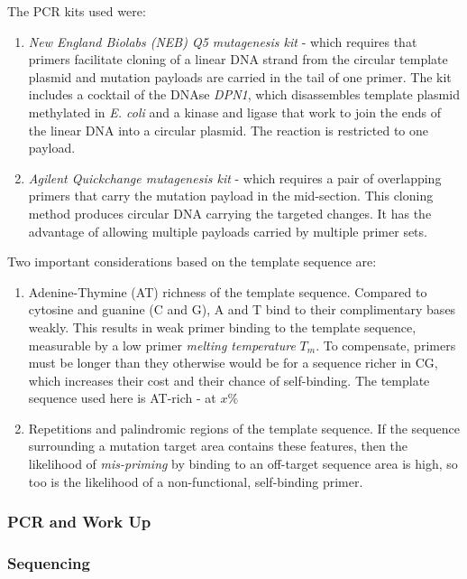 \documentclass{article}
\begin{document}
The PCR kits used were:

\begin{enumerate}
	\item \textit{New England Biolabs (NEB) Q5 mutagenesis kit} - which requires that primers facilitate cloning of a linear DNA strand from the circular template plasmid and mutation payloads are carried in the tail of one primer.
	The kit includes a cocktail of the DNAse \textit{DPN1}, which disassembles template plasmid methylated in \textit{E. coli} and a kinase and ligase that work to join the ends of the linear DNA into a circular plasmid.
	The reaction is restricted to one payload.

	\item \textit{Agilent Quickchange mutagenesis kit} - which requires a pair of overlapping primers that carry the mutation payload in the mid-section.
	This cloning method produces circular DNA carrying the targeted changes. 
	It has the advantage of allowing multiple payloads carried by multiple primer sets.
\end{enumerate}

Two important considerations based on the template sequence are:

\begin{enumerate}
	\item Adenine-Thymine (AT) richness of the template sequence. Compared to cytosine and guanine (C and G), A and T bind to their complimentary bases weakly.
		This results in weak primer binding to the template sequence, measurable by a low primer \textit{melting temperature} $T_m$.
	To compensate, primers must be longer than they otherwise would be for a sequence richer in CG, which increases their cost and their chance of self-binding.
	The template sequence used here is AT-rich - at $x\%$
	\item Repetitions and palindromic regions of the template sequence. 
		If the sequence surrounding a mutation target area contains these features, then the likelihood of \textit{mis-priming} by binding to an off-target sequence area is high, so too is the likelihood of a non-functional, self-binding primer.
\end{enumerate}


\subsubsection{PCR and Work Up}




\subsubsection{Sequencing}
\end{document}
